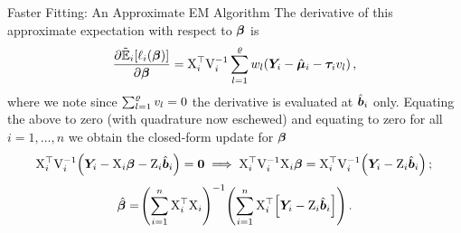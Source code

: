 \begin{chapter}{\label{cha:approx}Faster Fitting: An Approximate EM Algorithm}
  The derivative of this approximate expectation with respect to $\bm{\beta}$ is
  \begin{align*}
      \frac{\partial\tilde{\mathbb{E}}_i\!\left[\ell_i\!\left(\bm{\beta}\right)\right]}{\partial\bm{\beta}}=\mathrm{X}_i^\top\mathrm{V}_i^{-1}\sum_{l=1}^\varrho w_l\!\left(\bm{Y}_i-\hat{\bm{\mu}}_i-\bm{\tau}_i v_l\right),
  \end{align*}
  where we note since $\sum_{l=1}^\varrho v_l=0$ the derivative is evaluated at $\hat{\bm{b}}_i$ only. Equating the above to zero (with quadrature now eschewed) and equating to zero for all $i=1,\dots,n$ we obtain the closed-form update for $\bm{\beta}$
  \begin{equation*}
      \mathrm{X}_i^\top\mathrm{V}_i^{-1}\!\left(\bm{Y}_i-\mathrm{X}_i\bm{\beta}-\mathrm{Z}_i\hat{\bm{b}}_i\right)=\bm{0}\implies\mathrm{X}_i^\top\mathrm{V}_i^{-1}\mathrm{X}_i\bm{\beta}=\mathrm{X}_i^\top\mathrm{V}_i^{-1}\!\left(\bm{Y}_i-\mathrm{Z}_i\hat{\bm{b}}_i\right)\nonumber;\\
  \end{equation*}
  \begin{align}    
      \hat{\bm{\beta}}=\!\left(\sum_{i=1}^n\mathrm{X}_i^\top\mathrm{X}_i\right)^{-1}\!\left(\sum_{i=1}^n\mathrm{X}_i^\top\!\left[\bm{Y}_i-\mathrm{Z}_i\hat{\bm{b}}_i\right]\right).
  \label{eq:approx-Mstep-beta}
  \end{align}


\end{chapter}

